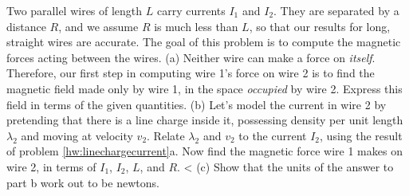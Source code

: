 Two parallel wires of length $L$ carry currents $I_1$ and $I_2$. They are separated
        by a distance $R$, and we assume $R$ is much less than $L$, so that our
        results for long, straight wires are accurate. The goal of this
        problem is to compute the magnetic forces acting between the wires.\hwendpart
        (a) Neither wire can make a force on \emph{itself}.
        Therefore, our first step in computing wire 1's force on wire 2
        is to find the magnetic
        field made only by wire 1, in the space \emph{occupied} by wire 2.
        Express this field in terms of the given quantities.\answercheck\hwendpart
        (b) Let's model the current in wire 2 by pretending that there is a
         line charge inside it, possessing density per unit length $\lambda_2$
         and moving at velocity $v_2$. 
        Relate $\lambda_2$ and $v_2$ to the current $I_2$, using the result of problem
        \ref{hw:linechargecurrent}a.
        Now find the magnetic force wire 1 makes on wire 2, in terms of
        $I_1$, $I_2$, $L$, and $R$. <%
        (c) Show that the units of the answer to part b work out to be newtons.
